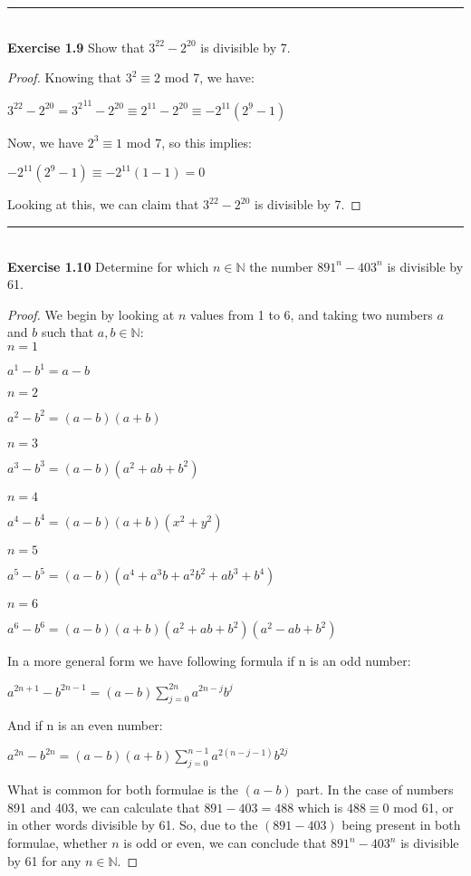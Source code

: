 \documentclass[a4paper]{article}
\begin{document}
\noindent\rule{12cm}{0.4pt}\\
\noindent \textbf{Exercise 1.9} Show that $3^{22}-2^{20}$ is divisible by 7.
\begin{proof}
Knowing that $3^2 \equiv 2$ mod 7, we have: \\
\begin{center}
	$3^{22}-2^{20} = {3^{2}}^{11}-2^{20} \equiv 2^{11} - 2^{20} \equiv {-2}^{11}(2^9-1)$
\end{center}
Now, we have $2^3 \equiv 1$ mod 7, so this implies:
 \begin{center}
	${-2}^{11}(2^9-1) \equiv {-2}^{11}(1-1) = 0$
\end{center}
Looking at this, we can claim that $3^{22}-2^{20}$ is divisible by 7.
\end{proof}



\noindent\rule{12cm}{0.4pt}\\
\noindent \textbf{Exercise 1.10} Determine for which $n \in \mathbb{N}$ the number $891^n - 403^n$ is divisible by 61.
\begin{proof}
We begin by looking at $n$ values from 1 to 6, and taking two numbers $a$ and $b$ such that $a, b \in \mathbb{N}$: \\
$n=1$
\begin{center}
	$a^1 - b^1 = a - b$
\end{center}
$n=2$
\begin{center}
	$a^2 - b^2 = (a - b)(a + b)$
\end{center}
$n=3$
\begin{center}
	$a^3 - b^3 = (a - b)(a^2 + ab + b^2)$
\end{center}
$n=4$
\begin{center}
	$a^4 - b^4 = (a - b)(a + b)(x^2 + y^2)$
\end{center}
$n=5$
\begin{center}
	$a^5 - b^5 = (a - b)(a^4 + a^{3}b + a^{2}b^{2} + ab^{3} + b^{4})$
\end{center}
$n=6$
\begin{center}
	$a^6 - b^6 = (a - b)(a + b)(a^2 + ab + b^2)(a^2 - ab + b^2)$
\end{center}
In a more general form we have following formula if n is an odd number: 
\begin{center}
	$a^{2n+1} - b^{2n-1} = (a - b)\sum_{j=0}^{2n}a^{2n-j}b^j$
\end{center}
\noindent And if n is an even number:
\begin{center}
	$a^{2n} - b^{2n} = (a - b)(a + b)\sum_{j=0}^{n-1}a^{2(n-j-1)}b^{2j}$
\end{center}
What is common for both formulae is the $(a - b)$ part. In the case of numbers 891 and 403, we can calculate that $891-403=488$ which is $488 \equiv 0$ mod 61, or in other words divisible by 61. So, due to the $(891-403)$ being present in both formulae, whether $n$ is odd or even, we can conclude that $891^n - 403^n$ is divisible by 61 for any $n \in \mathbb{N}$.
\end{proof}
\end{document}
